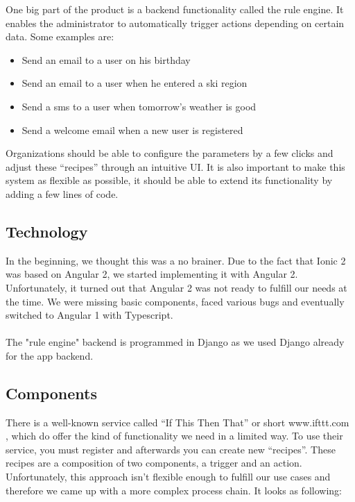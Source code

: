 \documentclass[11pt]{article} %
\begin{document}
One big part of the product is a backend functionality called the rule engine. It enables the administrator to automatically trigger actions depending on certain data. Some examples are:

\begin{itemize}
  \item Send an email to a user on his birthday
  \item Send an email to a user when he entered a ski region
  \item Send a sms to a user when tomorrow's weather is good
  \item Send a welcome email when a new user is registered
\end{itemize}

Organizations should be able to configure the parameters by a few clicks and adjust these “recipes” through an intuitive UI. It is also important to make this system as flexible as possible, it should be able to extend its functionality by adding a few lines of code.

\subsection{Technology}
In the beginning, we thought this was a no brainer. Due to the fact that Ionic 2 was based on Angular 2, we started implementing it with Angular 2. Unfortunately, it turned out that Angular 2 was not ready to fulfill our needs at the time. We were missing basic components, faced various bugs and eventually switched to Angular 1 with Typescript.\\
\\
The "rule engine" backend is programmed in Django as we used Django already for the app backend.

\subsection{Components}
There is a well-known service called “If This Then That” or short www.ifttt.com\cite{ifttt} , which do offer the kind of functionality we need in a limited way. To use their service, you must register and afterwards you can create new “recipes”. These recipes are a composition of two components, a trigger and an action. Unfortunately, this approach isn’t flexible enough to fulfill our use cases and therefore we came up with a more complex process chain. It looks as following:
\end{document}
